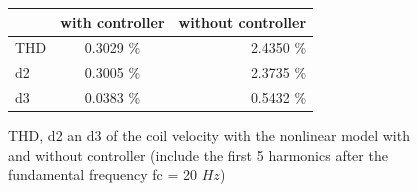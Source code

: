 \begin{figure}[H]
 \centering 
\begin{tabular}{|l|c|r|}
  \hline
   & with controller & without controller \\
  \hline
  THD & 0.3029 \% & 2.4350 \%\\
	\hline
  d2 & 0.3005 \%& 2.3735 \%\\
	\hline
	d3 & 0.0383 \%& 0.5432 \%\\
  \hline
\end{tabular}
\caption{THD, d2 an d3 of the coil velocity with the nonlinear model with and without controller (include the first 5 harmonics after the fundamental frequency fc = 20 $Hz$)}
	\label{fig:tabTHD}
	\end{figure}